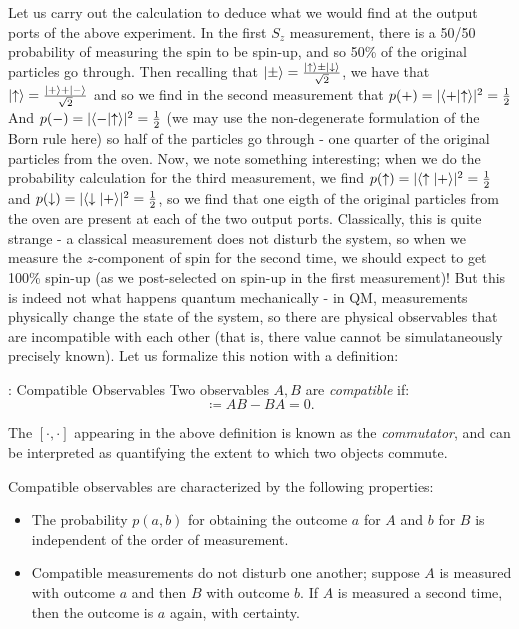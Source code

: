Let us carry out the calculation to deduce what we would find at the output ports of the above experiment. In the first $S_z$ measurement, there is a 50/50 probability of measuring the spin to be spin-up, and so 50\% of the original particles go through. Then recalling that $\lvert \pm \rangle = \frac{\lvert \uparrow \rangle \pm \lvert \downarrow \rangle}{\sqrt{2}}$, we have that $\lvert \uparrow \rangle = \frac{\lvert + \rangle + \lvert - \rangle}{\sqrt{2}}$ and so we find in the second measurement that $p(+) = \lvert \langle + \lvert \uparrow \rangle \rvert^2 = \frac{1}{2}$ And $p(-) = \lvert \langle - \lvert \uparrow \rangle \rvert^2 = \frac{1}{2}$ (we may use the non-degenerate formulation of the Born rule here) so half of the particles go through - one quarter of the original particles from the oven. Now, we note something interesting; when we do the probability calculation for the third measurement, we find $p(\uparrow) = \lvert \langle \uparrow \lvert + \rangle \rvert^2 = \frac{1}{2}$ and $p(\downarrow) = \lvert \langle \downarrow \lvert + \rangle \rvert^2 = \frac{1}{2}$, so we find that one eigth of the original particles from the oven are present at each of the two output ports. Classically, this is quite strange - a classical measurement does not disturb the system, so when we measure the $z$-component of spin for the second time, we should expect to get 100\% spin-up (as we post-selected on spin-up in the first measurement)! But this is indeed not what happens quantum mechanically - in QM, measurements physically change the state of the system, so there are physical observables that are incompatible with each other (that is, there value cannot be simulataneously precisely known). Let us formalize this notion with a definition:

\begin{defbox}{: Compatible Observables}
    Two observables $A, B$ are \emph{compatible} if:
    \begin{equation}
        [A, B] \coloneqq AB - BA = 0.
    \end{equation}
\end{defbox}

The $[\cdot, \cdot]$ appearing in the above definition is known as the \emph{commutator}, and can be interpreted as quantifying the extent to which two objects commute.

Compatible observables are characterized by the following properties:
\begin{itemize}
    \item The probability $p(a, b)$ for obtaining the outcome $a$ for $A$ and $b$ for $B$ is independent of the order of measurement.
    \item Compatible measurements do not disturb one another; suppose $A$ is measured with outcome $a$ and then $B$ with outcome $b$. If $A$ is measured a second time, then the outcome is $a$ again, with certainty.
\end{itemize}


